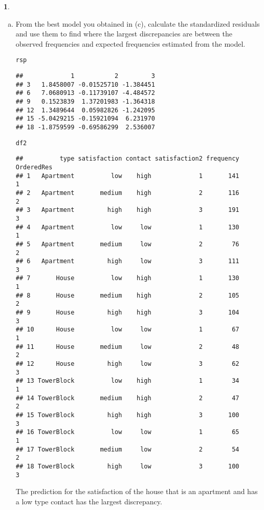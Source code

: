 \documentclass[12pt,fleqn]{article}\usepackage[]{graphicx}\usepackage[]{color}
\makeatletter
\newcommand{\hlstd}[1]{\textcolor[rgb]{0.345,0.345,0.345}{#1}}%
\newenvironment{kframe}{%
 \def\at@end@of@kframe{}%
 \ifinner\ifhmode%
  \def\at@end@of@kframe{\end{minipage}}%
  \begin{minipage}{\columnwidth}%
 \fi\fi%
 \def\FrameCommand##1{\hskip\@totalleftmargin \hskip-\fboxsep
 \colorbox{shadecolor}{##1}\hskip-\fboxsep
     \hskip-\linewidth \hskip-\@totalleftmargin \hskip\columnwidth}%
 \MakeFramed {\advance\hsize-\width
   \@totalleftmargin\z@ \linewidth\hsize
   \@setminipage}}%
 {\par\unskip\endMakeFramed%
 \at@end@of@kframe}
\newenvironment{knitrout}{}{} %
\theoremstyle{definition}
\newtheorem{problem}{}
\makeatother
\begin{document}
\begin{problem}
\begin{enumerate}[c.]
  \item From the best model you obtained in (c), calculate the standardized residuals and use them to find where the largest discrepancies are between the observed frequencies and expected frequencies estimated from the model.
\begin{knitrout}
\color{fgcolor}\begin{kframe}
\begin{alltt}
\hlstd{rsp}
\end{alltt}
\begin{verbatim}
##             1           2         3
## 3   1.8458007 -0.01525710 -1.384451
## 6   7.0680913 -0.11739107 -4.484572
## 9   0.1523839  1.37201983 -1.364318
## 12  1.3489644  0.05982826 -1.242095
## 15 -5.0429215 -0.15921094  6.231970
## 18 -1.8759599 -0.69586299  2.536007
\end{verbatim}
\begin{alltt}
\hlstd{df2}
\end{alltt}
\begin{verbatim}
##          type satisfaction contact satisfaction2 frequency OrderedRes
## 1   Apartment          low    high             1       141          1
## 2   Apartment       medium    high             2       116          2
## 3   Apartment         high    high             3       191          3
## 4   Apartment          low     low             1       130          1
## 5   Apartment       medium     low             2        76          2
## 6   Apartment         high     low             3       111          3
## 7       House          low    high             1       130          1
## 8       House       medium    high             2       105          2
## 9       House         high    high             3       104          3
## 10      House          low     low             1        67          1
## 11      House       medium     low             2        48          2
## 12      House         high     low             3        62          3
## 13 TowerBlock          low    high             1        34          1
## 14 TowerBlock       medium    high             2        47          2
## 15 TowerBlock         high    high             3       100          3
## 16 TowerBlock          low     low             1        65          1
## 17 TowerBlock       medium     low             2        54          2
## 18 TowerBlock         high     low             3       100          3
\end{verbatim}
\end{kframe}
\end{knitrout}
The prediction for the satisfaction of the house that is an apartment and has a low type contact has the largest discrepancy.

  \end{enumerate}
  \end{problem}
\end{document}
